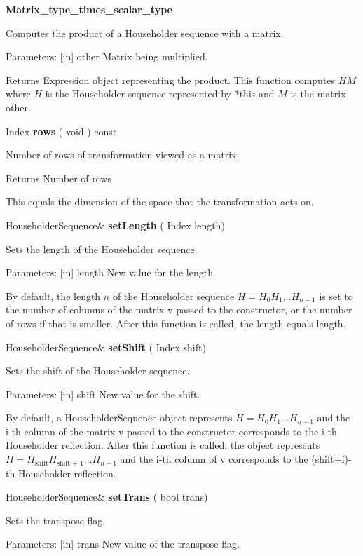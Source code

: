\vspace{0.3cm}
\textbf{Matrix\_type\_times\_scalar\_type}

Computes the product of a Householder sequence with a matrix. 

Parameters: [in] other Matrix being multiplied.  

Returns Expression object representing the product.
This function computes $HM$ where $H$ is the Householder sequence represented by *this and  $M$ is the matrix other. 


\vspace{0.3cm}
Index \textbf{rows}  ( void  )  const 

Number of rows of transformation viewed as a matrix. 

Returns Number of rows

This equals the dimension of the space that the transformation acts on. 


\vspace{0.3cm}
HouseholderSequence\& \textbf{setLength}  ( Index  length)   

Sets the length of the Householder sequence. 

Parameters: [in] length New value for the length. 

By default, the length $n$ of the Householder sequence $H=H_0 H_1 \ldots H_{n-1}$ is set to the number of columns of the matrix v passed to the constructor, or the number of rows if that is smaller. After this function is called, the length equals length.


\vspace{0.3cm}
HouseholderSequence\& \textbf{setShift}  ( Index  shift)   

Sets the shift of the Householder sequence. 

Parameters: [in] shift New value for the shift. 

By default, a HouseholderSequence object represents  $H=H_0 H_1 \ldots H_{n-1}$  and the i-th column of the matrix v passed to the constructor corresponds to the i-th Householder reflection. After this function is called, the object represents  $H=H_{\text{shift}} H_{\text{shift + 1}} \ldots H_{n-1}$  and the i-th column of v corresponds to the (shift+i)-th Householder reflection.


\vspace{0.3cm}
HouseholderSequence\& \textbf{setTrans}  ( bool  trans)   

Sets the transpose flag. 

Parameters: [in] trans New value of the transpose flag. 

